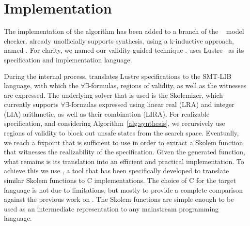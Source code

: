 \section{Implementation}
\label{sec:impl}

The implementation of the algorithm has been added to a branch of the  \jkind~\cite{jkind} model checker.  \jkind already unofficially supports synthesis,
using a k-inductive approach, named \jsyn. For clarity, we named
our validity-guided technique \jsynvg. \jkind uses Lustre~\cite{lustrev6} as its specification and implementation language.
\iffalse
, which functions as an intermediate representation to the Architecture Analysis and Design Language (\textsc{AADL})~\cite{feiler2006architecture}.
The latter is a high-level specification and analysis language with which
contracts are expressed, using the Assume-Guarantee Reasoning (\textsc{AGREE})
framework~\cite{NFM2012:CoGaMiWhLaLu}.
\andrew{it seems strange to be talking about AADL and maybe even AGREE  at all here.}

\fi

During the internal process, \jsynvg translates Lustre specifications to
the SMT-LIB language, with which the $\forall\exists$-formulas, regions of
validity, as well as the witnesses are expressed. The underlying solver that is
used is the \aeval Skolemizer, which currently supports
$\forall\exists$-formulas expressed using linear real (LRA) and integer (LIA) arithmetic, as well as
their combination (LIRA).
%
For realizable specification, and considering Algorithm~\ref{alg:synthesis}, we
recursively use regions of validity to block out unsafe states from the search
space.
Eventually, we reach a fixpoint that is sufficient to use in order to extract
a Skolem function that witnesses the realizability of the specification. Given
the generated function, what remains is its translation
into an efficient and practical implementation. To achieve this we use
\smtlibtoc, a tool that has been specifically developed to translate
similar \aeval Skolem functions to C implementations. The choice of C for
the target language is not due to limitations, but mostly to provide a complete
comparison against the previous work on \jsyn.
The Skolem functions are simple enough to be used as an intermediate
representation to any mainstream programming language.




